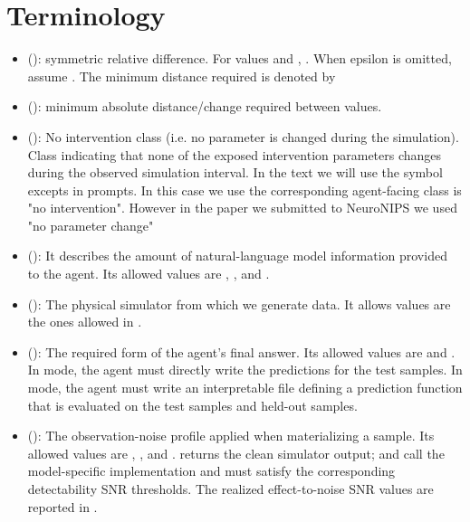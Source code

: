 \documentclass[11pt]{article}
\begin{document}
\label{docstart:terminology_common_utilities}

\section*{Terminology}
\begin{itemize}
\item (\termSRD): symmetric relative difference. For values  and , .
When epsilon is omitted, assume .
The minimum \termSRD distance required is denoted by \termMinSRDDistance
\item (\termMinAbsDist): minimum absolute distance/change required between values.
\item (\termNoParameterChangeClass): No intervention class (i.e. no parameter is changed during the simulation). Class indicating that none of the exposed intervention parameters changes during the observed simulation interval. In the text we will use the symbol \termNoParameterChangeClass excepts in prompts.
In this case we use the corresponding agent-facing class is "no intervention". However in the paper we submitted to NeuroNIPS we used "no parameter change"
\item (\termDescLevel): It describes the amount of natural-language model information provided to the agent. Its allowed values are , , and .
\item (\termSimulator): The physical simulator from which we generate data. It allows values are the ones allowed in .
\item (\termTaskMode): The required form of the agent's final answer. 
Its allowed values are  and . 
In  mode, the agent must directly write the predictions for the test samples. In  mode, the agent must write an interpretable  file defining a prediction function that is evaluated on the test samples and held-out samples.
\item (\termNoiseLevel): The observation-noise profile applied when materializing a sample. Its allowed values are , , and .  returns the clean simulator output;  and  call the model-specific  implementation and must satisfy the corresponding detectability SNR thresholds. The realized effect-to-noise SNR values are reported in .
\end{itemize}
\end{document}
